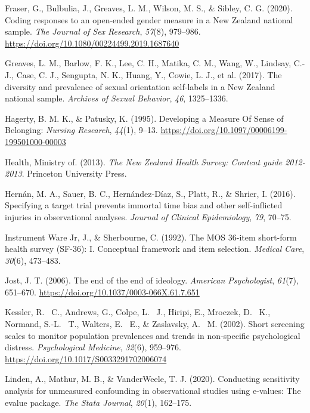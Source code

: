 \documentclass[
  single column]{article}
\newlength{\cslhangindent}
\newenvironment{CSLReferences}[2] %
 {\begin{list}{}{%
  \setlength{\itemindent}{0pt}
  \setlength{\leftmargin}{0pt}
  \setlength{\parsep}{0pt}
  \ifodd #1
   \setlength{\leftmargin}{\cslhangindent}
   \setlength{\itemindent}{-1\cslhangindent}
  \fi
  \setlength{\itemsep}{#2\baselineskip}}}
 {\end{list}}
\begin{document}
\begin{CSLReferences}{1}{0}
Fraser, G., Bulbulia, J., Greaves, L. M., Wilson, M. S., \& Sibley, C.
G. (2020). Coding responses to an open-ended gender measure in a {N}ew
{Z}ealand national sample. \emph{The Journal of Sex Research},
\emph{57}(8), 979--986.
\url{https://doi.org/10.1080/00224499.2019.1687640}

Greaves, L. M., Barlow, F. K., Lee, C. H., Matika, C. M., Wang, W.,
Lindsay, C.-J., Case, C. J., Sengupta, N. K., Huang, Y., Cowie, L. J.,
et al. (2017). The diversity and prevalence of sexual orientation
self-labels in a {N}ew {Z}ealand national sample. \emph{Archives of
Sexual Behavior}, \emph{46}, 1325--1336.

Hagerty, B. M. K., \& Patusky, K. (1995). Developing a Measure Of Sense
of Belonging: \emph{Nursing Research}, \emph{44}(1), 9--13.
\url{https://doi.org/10.1097/00006199-199501000-00003}

Health, Ministry of. (2013). \emph{The {N}ew {Z}ealand {H}ealth
{S}urvey: Content guide 2012-2013}. Princeton University Press.

Hernán, M. A., Sauer, B. C., Hernández-Díaz, S., Platt, R., \& Shrier,
I. (2016). Specifying a target trial prevents immortal time bias and
other self-inflicted injuries in observational analyses. \emph{Journal
of Clinical Epidemiology}, \emph{79}, 70--75.

Instrument Ware Jr, J., \& Sherbourne, C. (1992). The MOS 36-item
short-form health survey (SF-36): I. Conceptual framework and item
selection. \emph{Medical Care}, \emph{30}(6), 473--483.

Jost, J. T. (2006). The end of the end of ideology. \emph{American
Psychologist}, \emph{61}(7), 651--670.
\url{https://doi.org/10.1037/0003-066X.61.7.651}

Kessler, R. ~C., Andrews, G., Colpe, L. ~J., Hiripi, E., Mroczek, D.
~K., Normand, S.-L. ~T., Walters, E. ~E., \& Zaslavsky, A. ~M. (2002).
Short screening scales to monitor population prevalences and trends in
non-specific psychological distress. \emph{Psychological Medicine},
\emph{32}(6), 959--976. \url{https://doi.org/10.1017/S0033291702006074}

Linden, A., Mathur, M. B., \& VanderWeele, T. J. (2020). Conducting
sensitivity analysis for unmeasured confounding in observational studies
using e-values: The evalue package. \emph{The Stata Journal},
\emph{20}(1), 162--175.


\end{CSLReferences}
\end{document}
